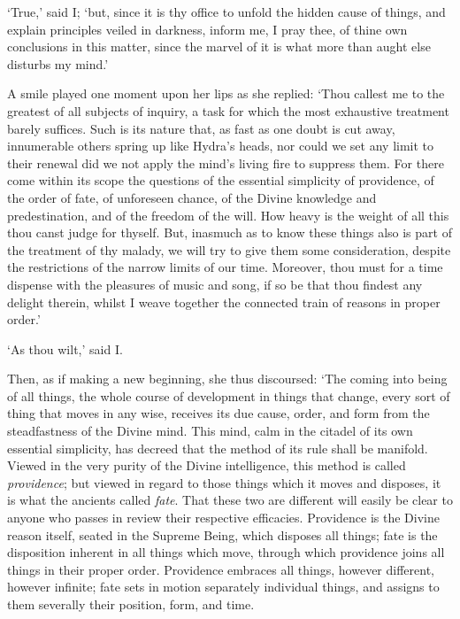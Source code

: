 \documentclass[11pt]{book}
\begin{document}
`True,' said I; `but, since it is thy office to unfold the hidden cause
of things, and explain principles veiled in darkness, inform me, I pray
thee, of thine own conclusions in this matter, since the marvel of it is
what more than aught else disturbs my mind.'

A smile played one moment upon her lips as she \linebreak replied: `Thou callest me
to the greatest of all subjects of inquiry, a task for which the most
exhaustive treatment barely suffices. Such is its nature that, as fast
as one doubt is cut away, innumerable others spring up like Hydra's
heads, nor could we set any limit to their renewal did we not apply the
mind's living fire to suppress them. For there come within its scope the
questions of the essential simplicity of providence, of the order of
fate, of unforeseen chance, of the Divine knowledge and predestination,
and of the freedom of the will. How heavy is the weight of all this
thou canst judge for thyself. But, inasmuch as to know these things also
is part of the treatment of thy malady, we will try to give them some
consideration, despite the restrictions of the narrow limits of our
time. Moreover, thou must for a time dispense with the pleasures of
music and song, if so be that thou findest any delight therein, whilst I
weave together the connected train of reasons in proper order.'

`As thou wilt,' said I.

Then, as if making a new beginning, she thus discoursed: `The coming
into being of all things, the whole course of development in things that
change, every sort of thing that moves in any wise, receives its due
cause, order, and form from the steadfastness of the Divine mind. This
mind, calm in the citadel of its own essential simplicity, has decreed
that the method of its rule shall be manifold. Viewed in the very purity
of the Divine intelligence, this method is called \emph{providence}; but
viewed in regard to those things which it moves and disposes, it is
what the ancients called \emph{fate}. That these two are different will
easily be clear to anyone who passes in review their respective
efficacies. Providence is the Divine reason itself, seated in the
Supreme Being, which disposes all things; fate is the disposition
inherent in all things which move, through which providence joins all
things in their proper order. Providence embraces all things, however
different, however infinite; fate sets in motion separately individual
things, and assigns to them severally their position, form, and time.
\end{document}
